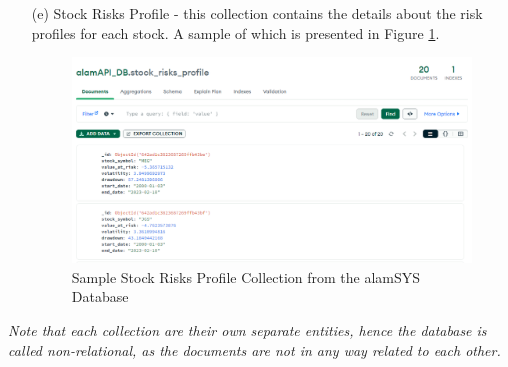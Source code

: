 \begin{itemize}
    \item[(e)] Stock Risks Profile  - this collection contains the details about the risk profiles
    for each stock. A sample of which is presented in Figure \ref{fig:odm_ml_sample}.
    \begin{figure}[ht]
        \centering
        \includegraphics[width=1\textwidth]{./assets/Chapter_3/ODM/ODM_Risks_Sample.png}
        \caption{Sample Stock Risks Profile Collection from the alamSYS Database}
        \label{fig:odm_ml_sample}
    \end{figure}
    \FloatBarrier

\end{itemize}
\textit{Note that each collection are their own separate entities, 
hence the database is called non-relational, as the documents are not in 
any way related to each other.}
\hfill \\